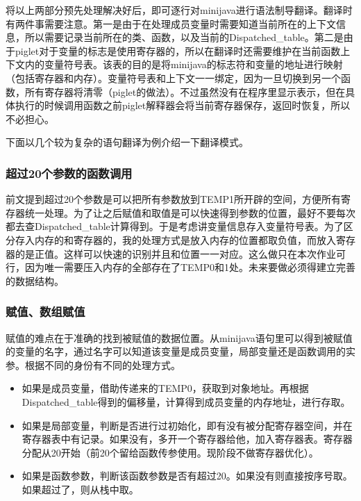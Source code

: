 \documentclass[10pt,a4paper]{article}
\begin{document}
将以上两部分预先处理解决好后，即可逐行对minijava进行语法制导翻译。翻译时有两件事需要注意。第一是由于在处理成员变量时需要知道当前所在的上下文信息，所以需要记录当前所在的类、函数，以及当前的Dispatched\_table。第二是由于piglet对于变量的标志是使用寄存器的，所以在翻译时还需要维护在当前函数上下文内的变量符号表。该表的目的是将minijava的标志符和变量的地址进行映射（包括寄存器和内存）。变量符号表和上下文一一绑定，因为一旦切换到另一个函数，所有寄存器将清零（piglet的做法）。不过虽然没有在程序里显示表示，但在具体执行的时候调用函数之前piglet解释器会将当前寄存器保存，返回时恢复，所以不必担心。

下面以几个较为复杂的语句翻译为例介绍一下翻译模式。

\subsubsection{超过20个参数的函数调用}

前文提到超过20个参数是可以把所有参数放到TEMP1所开辟的空间，方便所有寄存器统一处理。为了让之后赋值和取值是可以快速得到参数的位置，最好不要每次都去查Dispatched\_table计算得到。于是考虑讲变量信息存入变量符号表。为了区分存入内存的和寄存器的，我的处理方式是放入内存的位置都取负值，而放入寄存器的是正值。这样可以快速的识别并且和位置一一对应。这么做只在本次作业可行，因为唯一需要压入内存的全部存在了TEMP0和1处。未来要做必须得建立完善的数据结构。

\subsubsection{赋值、数组赋值}

赋值的难点在于准确的找到被赋值的数据位置。从minijava语句里可以得到被赋值的变量的名字，通过名字可以知道该变量是成员变量，局部变量还是函数调用的实参。根据不同的身份有不同的处理方式。
\begin{itemize}
	\item 如果是成员变量，借助传递来的TEMP0，获取到对象地址。再根据\\Dispatched\_table得到的偏移量，计算得到成员变量的内存地址，进行存取。
	\item 如果是局部变量，判断是否进行过初始化，即有没有被分配寄存器空间，并在寄存器表中有记录。如果没有，多开一个寄存器给他，加入寄存器表。寄存器分配从20开始（前20个留给函数传参使用。现阶段不做寄存器优化）。
	\item 如果是函数参数，判断该函数参数是否有超过20。如果没有则直接按序号取。如果超过了，则从栈中取。       
\end{itemize}    
\end{document}
